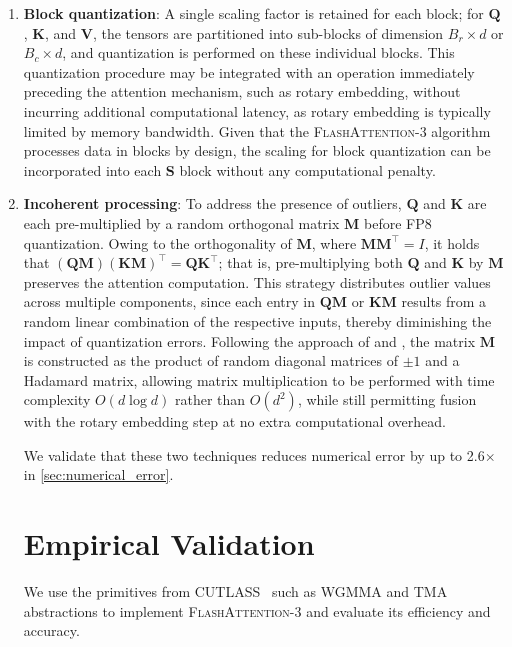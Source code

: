 \begin{algorithm}[H]
\begin{algorithmic}[1]
\begin{enumerate}
\item \textbf{Block quantization}: A single scaling factor is retained for each block; for $\mathbf{Q}$, $\mathbf{K}$, and $\mathbf{V}$, the tensors are partitioned into sub-blocks of dimension $B_r \times d$ or $B_c \times d$, and quantization is performed on these individual blocks. This quantization procedure may be integrated with an operation immediately preceding the attention mechanism, such as rotary embedding, without incurring additional computational latency, as rotary embedding is typically limited by memory bandwidth. Given that the \textsc{FlashAttention-3} algorithm processes data in blocks by design, the scaling for block quantization can be incorporated into each $\mathbf{S}$ block without any computational penalty.

\item \textbf{Incoherent processing}: To address the presence of outliers, $\mathbf{Q}$ and $\mathbf{K}$ are each pre-multiplied by a random orthogonal matrix $\mathbf{M}$ before FP8 quantization. Owing to the orthogonality of $\mathbf{M}$, where $\mathbf{M}\mathbf{M}^\top = I$, it holds that $(\mathbf{Q}\mathbf{M})(\mathbf{K}\mathbf{M})^\top = \mathbf{Q}\mathbf{K}^\top$; that is, pre-multiplying both $\mathbf{Q}$ and $\mathbf{K}$ by $\mathbf{M}$ preserves the attention computation. This strategy distributes outlier values across multiple components, since each entry in $\mathbf{Q}\mathbf{M}$ or $\mathbf{K}\mathbf{M}$ results from a random linear combination of the respective inputs, thereby diminishing the impact of quantization errors. Following the approach of \citet{chee2024quip} and \citet{tseng2024quip}, the matrix $\mathbf{M}$ is constructed as the product of random diagonal matrices of $\pm 1$ and a Hadamard matrix, allowing matrix multiplication to be performed with time complexity $O(d \log d)$ rather than $O(d^2)$, while still permitting fusion with the rotary embedding step at no extra computational overhead.

We validate that these two techniques reduces numerical error by up to 2.6$\times$ in \cref{sec:numerical_error}.

\section{Empirical Validation}
\label{sec:exp}

We use the primitives from CUTLASS~\citep{Thakkar_CUTLASS_2023} such as WGMMA and TMA abstractions to implement \textsc{FlashAttention-3} and evaluate its efficiency and accuracy.


\end{enumerate}
\end{algorithmic}
\end{algorithm}
